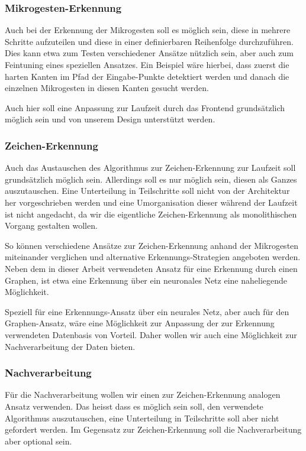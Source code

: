 \subsubsection{Mikrogesten-Erkennung}

Auch bei der Erkennung der Mikrogesten soll es möglich sein, diese in mehrere Schritte aufzuteilen und diese in einer definierbaren Reihenfolge durchzuführen. Dies kann etwa zum Testen verschiedener Ansätze nützlich sein, aber auch zum Feintuning eines speziellen Ansatzes. Ein Beispiel wäre hierbei, dass zuerst die harten Kanten im Pfad der Eingabe-Punkte detektiert werden und danach die einzelnen Mikrogesten in diesen Kanten gesucht werden.

Auch hier soll eine Anpassung zur Laufzeit durch das Frontend grundsätzlich möglich sein und von unserem Design unterstützt werden.

\subsubsection{Zeichen-Erkennung}

Auch das Austauschen des Algorithmus zur Zeichen-Erkennung zur Laufzeit soll grundsätzlich möglich sein. Allerdings soll es nur möglich sein, diesen als Ganzes auszutauschen. Eine Unterteilung in Teilschritte soll nicht von der Architektur her vorgeschrieben werden und eine Umorganisation dieser während der Laufzeit ist nicht angedacht, da wir die eigentliche Zeichen-Erkennung als monolithischen Vorgang gestalten wollen.

So können verschiedene Ansätze zur Zeichen-Erkennung anhand der Mikrogesten miteinander verglichen und alternative Erkennungs-Strategien angeboten werden. Neben dem in dieser Arbeit verwendeten Ansatz für eine Erkennung durch einen Graphen, ist etwa eine Erkennung über ein neuronales Netz eine naheliegende Möglichkeit.

Speziell für eine Erkennungs-Ansatz über ein neurales Netz, aber auch für den Graphen-Ansatz, wäre eine Möglichkeit zur Anpassung der zur Erkennung verwendeten Datenbasis von Vorteil. Daher wollen wir auch eine Möglichkeit zur Nachverarbeitung der Daten bieten.

\subsubsection{Nachverarbeitung}

Für die Nachverarbeitung wollen wir einen zur Zeichen-Erkennung analogen Ansatz verwenden. Das heisst dass es möglich sein soll, den verwendete Algorithmus auszutauschen, eine Unterteilung in Teilschritte soll aber nicht gefordert werden. Im Gegensatz zur Zeichen-Erkennung soll die Nachverarbeitung aber optional sein.

